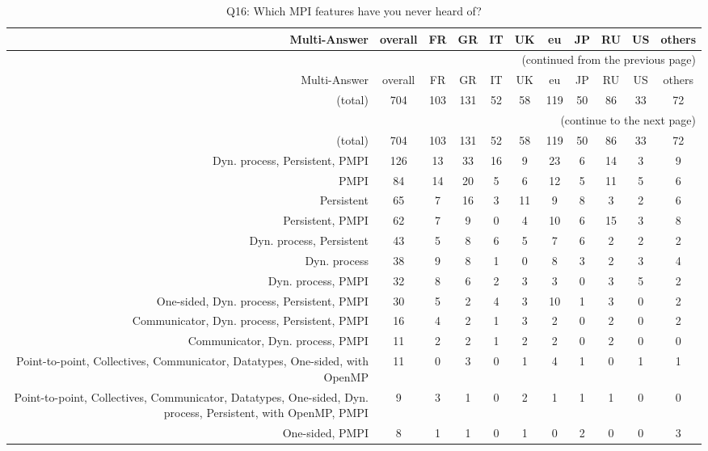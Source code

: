 \clearpage%
{\footnotesize\begin{landscape}%
\begin{longtable}[htb]{r|c|c|c|c|c|c|c|c|c|c}%
\caption{Q16: Which MPI features have you never heard of?}%
\label{tab:Q16-mans} \\%
\hline%
Multi-Answer & overall & FR & GR & IT & UK & eu & JP & RU & US & others \\
 \hline%
\endfirsthead%
\multicolumn{11}{r}{(continued from the previous page)}\\%
\hline%
Multi-Answer & overall & FR & GR & IT & UK & eu & JP & RU & US & others \\
 \hline%
\endhead%
\hline%
(total) & 704 & 103 & 131 & 52 & 58 & 119 & 50 & 86 & 33 & 72 \\%
\hline%
\multicolumn{11}{r}{(continue to the next page)}\\%
\endfoot%
\hline%
(total) & 704 & 103 & 131 & 52 & 58 & 119 & 50 & 86 & 33 & 72 \\%
\hline%
\endlastfoot%
\hline%
{Dyn. process, Persistent, PMPI} & 126 & 13 & 33 & 16 & 9 & 23 & 6 & 14 & 3 & 9 \\%
{PMPI} & 84 & 14 & 20 & 5 & 6 & 12 & 5 & 11 & 5 & 6 \\%
{Persistent} & 65 & 7 & 16 & 3 & 11 & 9 & 8 & 3 & 2 & 6 \\%
{Persistent, PMPI} & 62 & 7 & 9 & 0 & 4 & 10 & 6 & 15 & 3 & 8 \\%
{Dyn. process, Persistent} & 43 & 5 & 8 & 6 & 5 & 7 & 6 & 2 & 2 & 2 \\%
{Dyn. process} & 38 & 9 & 8 & 1 & 0 & 8 & 3 & 2 & 3 & 4 \\%
{Dyn. process, PMPI} & 32 & 8 & 6 & 2 & 3 & 3 & 0 & 3 & 5 & 2 \\%
{One-sided, Dyn. process, Persistent, PMPI} & 30 & 5 & 2 & 4 & 3 & 10 & 1 & 3 & 0 & 2 \\%
{Communicator, Dyn. process, Persistent, PMPI} & 16 & 4 & 2 & 1 & 3 & 2 & 0 & 2 & 0 & 2 \\%
{Communicator, Dyn. process, PMPI} & 11 & 2 & 2 & 1 & 2 & 2 & 0 & 2 & 0 & 0 \\%
{Point-to-point, Collectives, Communicator, Datatypes, One-sided, with OpenMP} & 11 & 0 & 3 & 0 & 1 & 4 & 1 & 0 & 1 & 1 \\%
{Point-to-point, Collectives, Communicator, Datatypes, One-sided, Dyn. process, Persistent, with OpenMP, PMPI} & 9 & 3 & 1 & 0 & 2 & 1 & 1 & 1 & 0 & 0 \\%
{One-sided, PMPI} & 8 & 1 & 1 & 0 & 1 & 0 & 2 & 0 & 0 & 3 \\%

\end{longtable}
\end{landscape}}

